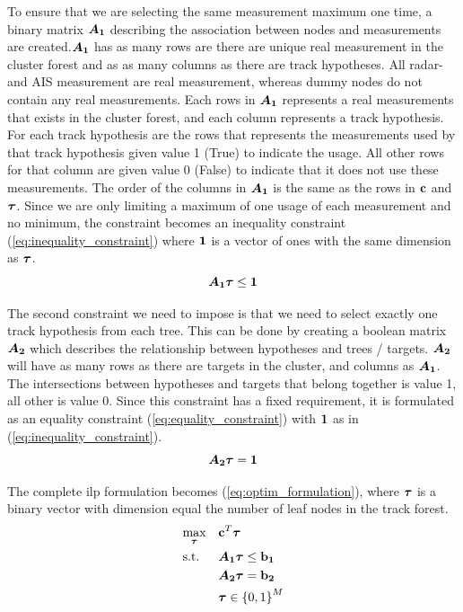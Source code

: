 To ensure that we are selecting the same measurement maximum one time, a binary matrix \( \bm{A_1} \) describing the association between nodes and measurements are created.\(\bm{A_1}\) has as many rows are there are unique real measurement in the cluster forest and as as many columns as there are track hypotheses. All radar- and AIS measurement are real measurement, whereas dummy nodes do not contain any real measurements. Each rows in \( \bm{A_1} \) represents a real measurements that exists in the cluster forest, and each column represents a track hypothesis. For each track hypothesis are the rows that represents the measurements used by that track hypothesis given value 1 (True) to indicate the usage. All other rows for that column are given value 0 (False) to indicate that it does not use these measurements. The order of the columns in \( \bm{A_1} \) is the same as the rows in \( \boldsymbol{\mathbf{c}} \) and \( \boldsymbol{\mathbf{\tau}} \). Since we are only limiting a maximum of one usage of each measurement and no minimum, the constraint becomes an inequality constraint (\ref{eq:inequality_constraint}) where \( \boldsymbol{\mathbf{1}} \) is a vector of ones with the same dimension as \( \boldsymbol{\mathbf{\tau}} \).
\begin{equation}\label{eq:inequality_constraint}
\bm{A_1} \boldsymbol{\mathbf{\tau}} \leq \boldsymbol{\mathbf{1}}
\end{equation}

The second constraint we need to impose is that we need to select exactly one track hypothesis from each tree. This can be done by creating a boolean matrix \( \bm{A_2} \) which describes the relationship between hypotheses and trees / targets. \( \bm{A_2} \) will have as many rows as there are targets in the cluster, and columns as \( \bm{A_1} \). The intersections between hypotheses and targets that belong together is value 1, all other is value 0. Since this constraint has a fixed requirement, it is formulated as an equality constraint (\ref{eq:equality_constraint}) with \( \boldsymbol{\mathbf{1}} \) as in (\ref{eq:inequality_constraint}).
\begin{equation}\label{eq:equality_constraint}
\bm{A_2} \boldsymbol{\mathbf{\tau}} = \boldsymbol{\mathbf{1}}
\end{equation}

The complete \gls{ilp} formulation becomes (\ref{eq:optim_formulation}), where \(\boldsymbol{\mathbf{\tau}}\) is a binary vector with dimension equal the number of leaf nodes in the track forest.
\begin{equation}
\begin{aligned}
&	\underset{\boldsymbol{\mathbf{\tau}}}{\text{max}}
&&	\boldsymbol{\mathbf{c}}^T \boldsymbol{\mathbf{\tau}} \\
&	\text{s.t.}
&&	\bm{A_1} \boldsymbol{\mathbf{\tau}} \leq \boldsymbol{\mathbf{b_1}} 	\\
&&&	\bm{A_2} \boldsymbol{\mathbf{\tau}} = \boldsymbol{\mathbf{b_2}}	\\
&&&	\boldsymbol{\mathbf{\tau}} \in {\{0,1\}}^{M}
\end{aligned}
\label{eq:optim_formulation}
\end{equation}

